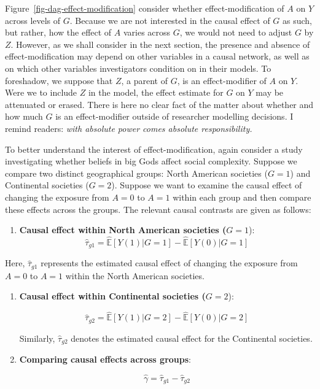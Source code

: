 \documentclass[
  singlecolumn]{article}
\providecommand{\tightlist}{%
  \setlength{\itemsep}{0pt}\setlength{\parskip}{0pt}}\usepackage{longtable,booktabs,array}
\begin{document}
Figure~\ref{fig-dag-effect-modification} consider whether
effect-modification of \(A\) on \(Y\) across levels of \(G\). Because we
are not interested in the causal effect of \(G\) as such, but rather,
how the effect of \(A\) varies across \(G\), we would not need to adjust
\(G\) by \(Z\). However, as we shall consider in the next section, the
presence and absence of effect-modification may depend on other
variables in a causal network, as well as on which other variables
investigators condition on in their models. To foreshadow, we suppose
that \(Z\), a parent of \(G\), is an effect-modifier of \(A\) on \(Y\).
Were we to include \(Z\) in the model, the effect estimate for \(G\) on
\(Y\) may be attenuated or erased. There is here no clear fact of the
matter about whether and how much \(G\) is an effect-modifier outside of
researcher modelling decisions. I remind readers: \emph{with absolute
power comes absolute responsibility.}

To better understand the interest of effect-modification, again consider
a study investigating whether beliefs in big Gods affect social
complexity. Suppose we compare two distinct geographical groups: North
American societies (\(G=1\)) and Continental societies (\(G=2\)).
Suppose we want to examine the causal effect of changing the exposure
from \(A = 0\) to \(A = 1\) within each group and then compare these
effects across the groups. The relevant causal contrasts are given as
follows:

\begin{enumerate}
\def\labelenumi{\arabic{enumi}.}
\tightlist
\item
  \textbf{Causal effect within North American societies (}\(G=1\)):
  \[\hat{\tau}_{g1} = \hat{\mathbb{E}}[Y(1)|G=1] - \hat{\mathbb{E}}[Y(0)|G=1]\]
\end{enumerate}

Here, \(\hat{\tau}_{g1}\) represents the estimated causal effect of
changing the exposure from \(A = 0\) to \(A = 1\) within the North
American societies.

\begin{enumerate}
\def\labelenumi{\arabic{enumi}.}
\setcounter{enumi}{1}
\item
  \textbf{Causal effect within Continental societies (}\(G=2\)):

  \[\hat{\tau}_{g2} = \hat{\mathbb{E}}[Y(1)|G=2] - \hat{\mathbb{E}}[Y(0)|G=2]\]

  Similarly, \(\hat{\tau}_{g2}\) denotes the estimated causal effect for
  the Continental societies.
\item
  \textbf{Comparing causal effects across groups}:

  \[\hat{\gamma} = \hat{\tau}_{g1} - \hat{\tau}_{g2}\]
\end{enumerate}
\end{document}
